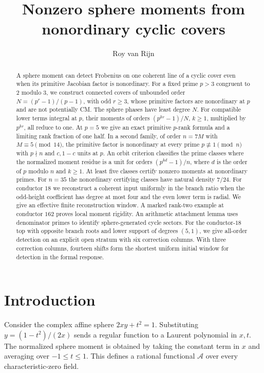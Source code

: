 \documentclass[11pt]{article}
\title{Nonzero sphere moments from nonordinary cyclic covers}
\author{Roy van Rijn}
\date{}
\newcommand{\A}{\mathcal A}
\begin{document}
\maketitle

\begin{abstract}
A sphere moment can detect Frobenius on one coherent line of a cyclic
cover even when its primitive Jacobian factor is nonordinary. For a fixed
prime \(p>3\) congruent to \(2\) modulo \(3\), we construct connected covers
of unbounded order \(N=(p^r-1)/(p-1)\), with odd \(r\ge3\), whose
primitive factors are nonordinary at \(p\) and are not potentially CM.
The sphere phases have least degree \(N\). For compatible lower
terms integral at \(p\), their moments of orders \((p^{kr}-1)/N\),
\(k\ge1\), multiplied by \(p^{kr}\), all reduce to one. At \(p=5\)
we give an exact primitive \(p\)-rank formula and a limiting rank
fraction of one half. In a second family, of order \(n=7M\) with
\(M\equiv5\pmod{14}\), the primitive factor is nonordinary at every
prime \(p\not\equiv1\pmod n\) with \(p\nmid n\) and \(c,1-c\)
units at \(p\). An orbit
criterion classifies the prime classes where the normalized moment
residue is a unit for orders \((p^{kd}-1)/n\), where \(d\) is the
order of \(p\) modulo \(n\) and \(k\ge1\). At least five classes
certify nonzero moments at nonordinary primes. For \(n=35\) the
nonordinary certifying classes have natural density \(7/24\).
For conductor \(18\) we reconstruct a coherent input uniformly
in the branch ratio when the odd-height coefficient has degree at most
four and the even lower term is radial. We give an effective finite
reconstruction window. A marked rank-two example at conductor \(162\)
proves local moment rigidity.
An arithmetic attachment lemma uses denominator primes to
identify sphere-generated cycle sectors. For the conductor-\(18\) top
with opposite branch roots and lower support of degrees \((5,1)\),
we give all-order detection on an explicit open stratum with six
correction columns. With three correction columns, fourteen shifts form
the shortest uniform initial window for detection in the formal response.
\end{abstract}

\section{Introduction}

Consider the complex affine sphere \(2xy+t^2=1\). Substituting
\(y=(1-t^2)/(2x)\) sends a regular function to a Laurent polynomial in
\(x,t\). The normalized sphere moment is obtained by taking the constant
term in \(x\) and averaging over \(-1\le t\le1\). This defines a rational
functional \(\A\) over every characteristic-zero field.
\end{document}

